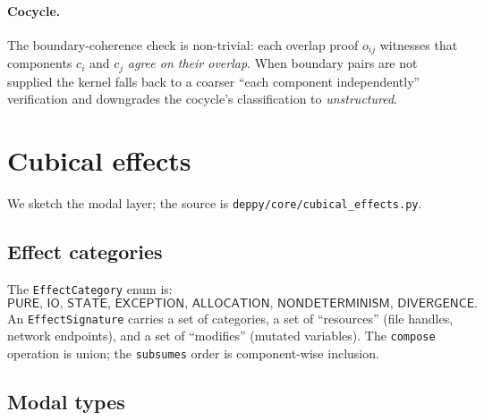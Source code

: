 \paragraph{Cocycle.}
\begin{mathpar}
\end{mathpar}

The boundary-coherence check is non-trivial: each overlap proof
$o_{ij}$ witnesses that components $c_i$ and $c_j$ \emph{agree on
their overlap}.  When boundary pairs are not supplied the kernel
falls back to a coarser ``each component independently''
verification and downgrades the cocycle's classification to
\emph{unstructured}.

\section{Cubical effects}
\label{sec:cubical-effects}

We sketch the modal layer; the source is
\texttt{deppy/core/cubical\_effects.py}.

\subsection{Effect categories}

The \texttt{EffectCategory} enum is:
\begin{equation*}
  \mathsf{PURE},\, \mathsf{IO},\, \mathsf{STATE},\, \mathsf{EXCEPTION},\,
  \mathsf{ALLOCATION},\, \mathsf{NONDETERMINISM},\, \mathsf{DIVERGENCE}.
\end{equation*}
An \texttt{EffectSignature} carries a set of categories, a set of
``resources'' (file handles, network endpoints), and a set of
``modifies'' (mutated variables).  The \texttt{compose} operation is
union; the \texttt{subsumes} order is component-wise inclusion.

\subsection{Modal types}

